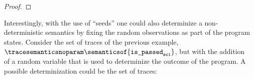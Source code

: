 \begin{proof}
\end{proof}

\begin{example}
  Interestingly, with the use of ``seeds'' one could also determinize a non-deterministic semantics by fixing the random observations as part of the program states.
  Consider the set of traces of the previous example, \cf{} $\tracesemanticsnoparam\semanticsof{\texttt{is\_passed}_\texttt{sci}}$, but with the addition of a random variable that is used to determinize the outcome of the program.
  A possible determinization could be the set of traces:
  \begin{marginfigure}[*5]
\end{marginfigure}
\end{example}
